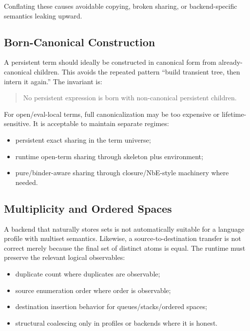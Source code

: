 \documentclass[11pt]{article}
\begin{document}
Conflating these causes avoidable copying, broken sharing, or backend-specific semantics leaking upward.

\subsection{Born-Canonical Construction}

A persistent term should ideally be constructed in canonical form from already-canonical children.  This avoids the repeated pattern ``build transient tree, then intern it again.''  The invariant is:

\begin{quote}
No persistent expression is born with non-canonical persistent children.
\end{quote}

For open/eval-local terms, full canonicalization may be too expensive or lifetime-sensitive.  It is acceptable to maintain separate regimes:

\begin{itemize}[leftmargin=*]
  \item persistent exact sharing in the term universe;
  \item runtime open-term sharing through skeleton plus environment;
  \item pure/binder-aware sharing through closure/NbE-style machinery where needed.
\end{itemize}

\subsection{Multiplicity and Ordered Spaces}

A backend that naturally stores sets is not automatically suitable for a language profile with multiset semantics.  Likewise, a source-to-destination transfer is not correct merely because the final set of distinct atoms is equal.  The runtime must preserve the relevant logical observables:

\begin{itemize}[leftmargin=*]
  \item duplicate count where duplicates are observable;
  \item source enumeration order where order is observable;
  \item destination insertion behavior for queues/stacks/ordered spaces;
  \item structural coalescing only in profiles or backends where it is honest.
\end{itemize}
\end{document}

